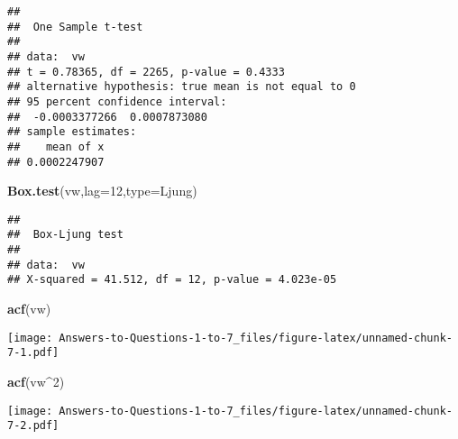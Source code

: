 \documentclass[
]{article}
\newenvironment{Shaded}{\begin{snugshade}}{\end{snugshade}}
\newcommand{\AttributeTok}[1]{\textcolor[rgb]{0.13,0.29,0.53}{#1}}
\newcommand{\CommentTok}[1]{\textcolor[rgb]{0.56,0.35,0.01}{\textit{#1}}}
\newcommand{\DecValTok}[1]{\textcolor[rgb]{0.00,0.00,0.81}{#1}}
\newcommand{\FunctionTok}[1]{\textcolor[rgb]{0.13,0.29,0.53}{\textbf{#1}}}
\newcommand{\NormalTok}[1]{#1}
\newcommand{\OtherTok}[1]{\textcolor[rgb]{0.56,0.35,0.01}{#1}}
\newcommand{\SpecialCharTok}[1]{\textcolor[rgb]{0.81,0.36,0.00}{\textbf{#1}}}
\newcommand{\StringTok}[1]{\textcolor[rgb]{0.31,0.60,0.02}{#1}}
\begin{document}
\begin{Shaded}
\end{Shaded}

\begin{verbatim}
## 
##  One Sample t-test
## 
## data:  vw
## t = 0.78365, df = 2265, p-value = 0.4333
## alternative hypothesis: true mean is not equal to 0
## 95 percent confidence interval:
##  -0.0003377266  0.0007873080
## sample estimates:
##    mean of x 
## 0.0002247907
\end{verbatim}

\begin{Shaded}
\begin{Highlighting}[]
\FunctionTok{Box.test}\NormalTok{(vw,}\AttributeTok{lag=}\DecValTok{12}\NormalTok{,}\AttributeTok{type=}\StringTok{\textquotesingle{}Ljung\textquotesingle{}}\NormalTok{)}
\end{Highlighting}
\end{Shaded}

\begin{verbatim}
## 
##  Box-Ljung test
## 
## data:  vw
## X-squared = 41.512, df = 12, p-value = 4.023e-05
\end{verbatim}

\begin{Shaded}
\begin{Highlighting}[]
\FunctionTok{acf}\NormalTok{(vw)}
\end{Highlighting}
\end{Shaded}

\texttt{[image: Answers-to-Questions-1-to-7\_files/figure-latex/unnamed-chunk-7-1.pdf]}

\begin{Shaded}
\begin{Highlighting}[]
\FunctionTok{acf}\NormalTok{(vw}\SpecialCharTok{\^{}}\DecValTok{2}\NormalTok{)}
\end{Highlighting}
\end{Shaded}

\texttt{[image: Answers-to-Questions-1-to-7\_files/figure-latex/unnamed-chunk-7-2.pdf]}
\end{document}
